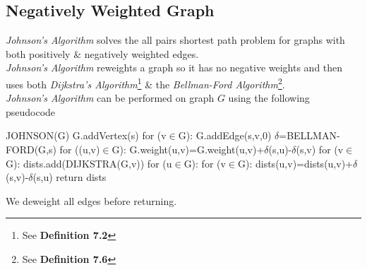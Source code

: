 \documentclass[11pt,a4paper]{article}
\begin{document}
\subsection{Negatively Weighted Graph}

\textit{Johnson's Algorithm} solves the all pairs shortest path problem for graphs with both positively \& negatively weighted edges.\\
\textit{Johnson's Algorithm} reweights a graph so it has no negative weights and then uses both \textit{Dijkstra's Algorithm}\footnote{See \textbf{Definition 7.2}} \& the \textit{Bellman-Ford Algorithm}\footnote{See \textbf{Definition 7.6}}.\\
\textit{Johnson's Algorithm} can be performed on graph $G$ using the following pseudocode
\begin{code}
JOHNSON(G)
G.addVertex(s)
for (v$\in$G):
  G.addEdge(s,v,0)
$\delta$=BELLMAN-FORD(G,s)
for ((u,v)$\in$G):
  G.weight(u,v)=G.weight(u,v)+$\delta$(s,u)-$\delta$(s,v)
for (v$\in$G):
  dists.add(DIJKSTRA(G,v))
for (u$\in$G):
  for (v$\in$G):
    dists(u,v)=dists(u,v)+$\delta$(s,v)-$\delta$(s,u)
return dists
\end{code}
\nb We deweight all edges before returning.\\
\end{document}
